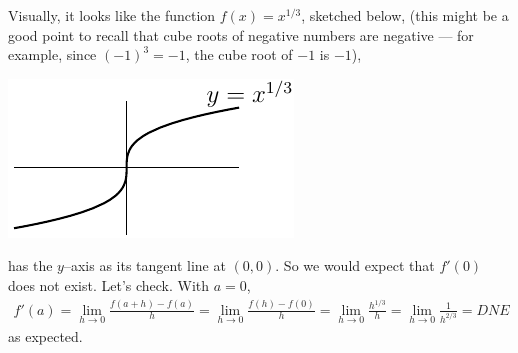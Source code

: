\begin{eg}[$\diff{}{x}x^{1/3}$]\label{eg:DIFFderivXthird}
Visually, it looks like the function $f(x) = x^{1/3}$, sketched below,
(this might be a good point to recall that cube roots of negative
numbers are negative --- for example, since $(-1)^3=-1$, the
cube root of $-1$ is $-1$),
\begin{efig}
  \begin{center}
  \includegraphics{Xthird}
  \end{center}
\end{efig}
has the $y$--axis as its tangent line at $(0,0)$. So we would
expect that $f'(0)$ does not exist. Let's check. With $a=0$,
\begin{align*}
f'(a)= \lim_{h\rightarrow 0}\frac{f(a+h)-f(a)}{h}
=\lim_{h\rightarrow 0}\frac{f(h)-f(0)}{h}
 =\lim_{h\rightarrow 0}\frac{h^{1/3}}{h}
 =\lim_{h\rightarrow 0}\frac{1}{h^{2/3}}
 =DNE
\end{align*}
as expected.

\end{eg}
